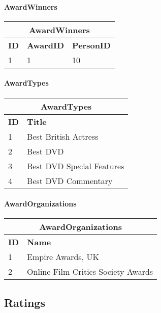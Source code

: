 \paragraph{AwardWinners}

\begin{center}
\begin{tabular}{|l|l|l|}
\hline
\multicolumn{3}{|c|}{AwardWinners} \\ \hline \hline
\textbf{ID} & \textbf{AwardID} & \textbf{PersonID} \\ \hline \hline
1 & 1 & 10 \\ \hline
\end{tabular}
\end{center}

\paragraph{AwardTypes}

\begin{center}
\begin{tabular}{|l|l|}
\hline
\multicolumn{2}{|c|}{AwardTypes} \\ \hline \hline
\textbf{ID} & \textbf{Title} \\ \hline \hline
1 & Best British Actress \\ \hline
2 & Best DVD \\ \hline
3 & Best DVD Special Features \\ \hline
4 & Best DVD Commentary \\ \hline
\end{tabular}
\end{center}

\paragraph{AwardOrganizations}

\begin{center}
\begin{tabular}{|l|l|}
\hline
\multicolumn{2}{|c|}{AwardOrganizations} \\ \hline \hline
\textbf{ID} & \textbf{Name} \\ \hline \hline
1 & Empire Awards, UK \\ \hline
2 & Online Film Critics Society Awards \\ \hline
\end{tabular}
\end{center}

\subsection{Ratings}

